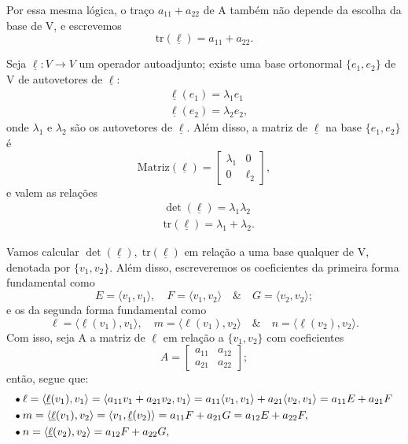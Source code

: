 \documentclass[../differential_geometry.tex]{subfiles}
\begin{document}
Por essa mesma lógica, o traço \(a_{11} + a_{22}\) de A também não depende da escolha da base de V, e escrevemos
\[
	\mathrm{tr}(\underline{\ell}) = a_{11} + a_{22}.
\]

\begin{theorem*}
	Seja \(\underline{\ell }:V\rightarrow V\) um operador autoadjunto; existe uma base ortonormal \(\{e_1, e_2\}\) de V de autovetores de \(\underline{\ell }\):
	\begin{align*}
		 & \underline{\ell }(e_1) = \lambda_1e_1  \\
		 & \underline{\ell }(e_2) = \lambda_2e_2,
	\end{align*}
	onde \(\lambda_1\) e \(\lambda_{2}\) são os autovetores de \(\underline{\ell }\). Além disso, a matriz de \(\underline{\ell }\) na base \(\{e_1, e_2\}\) é
	\[
		\mathrm{Matriz}(\underline{\ell }) = \begin{bmatrix}
			\lambda_1 & 0      \\
			0         & \ell_2
		\end{bmatrix},
	\]
	e valem as relações
	\begin{align*}
		 & \det{(\underline{\ell })}=\lambda_1\lambda_2            \\
		 & \mathrm{tr}(\underline{\ell }) = \lambda_1 + \lambda_2.
	\end{align*}
\end{theorem*}
Vamos calcular \(\det{(\underline{\ell })},\; \mathrm{tr}(\underline{\ell })\) em relação a uma base qualquer de V, denotada por \(\{v_1, v_2\}\). Além disso, escreveremos os coeficientes da primeira forma fundamental como
\[
	E = \langle v_1, v_1 \rangle,\quad F = \langle v_1, v_2 \rangle \quad\&\quad G = \langle v_2, v_2 \rangle;
\]
e os da segunda forma fundamental como
\[
	\ell = \langle \underline{\ell }(v_1), v_1 \rangle,\quad m = \langle \ell (v_1), v_2 \rangle \quad\&\quad n = \langle \underline{\ell} (v_2), v_2 \rangle.
\]
Com isso, seja A a matriz de \(\underline{\ell }\) em relação a \(\{v_1, v_2\}\) com coeficientes
\[
	A = \begin{bmatrix}
		a_{11} & a_{12} \\
		a_{21} & a_{22}
	\end{bmatrix};
\]
então, segue que:
\begin{align*}
	 & \tikz[baseline=-0.5ex]\draw[black, fill=black, radius=1.5pt](0, 0)circle;\; \ell = \langle \underline{\ell }(v_1), v_1 \rangle = \langle a_{11}v_1 + a_{21}v_2, v_1 \rangle = a_{11}\langle v_1, v_1 \rangle + a_{21}\langle v_{2}, v_1 \rangle = a_{11}E + a_{21}F \\
	 & \tikz[baseline=-0.5ex]\draw[black, fill=black, radius=1.5pt](0, 0)circle;\; m = \langle \underline{\ell }(v_1), v_2 \rangle = \langle v_1, \underline{\ell }(v_2) \rangle = a_{11}F + a_{21}G = a_{12}E + a_{22}F,                                                  \\
	 & \tikz[baseline=-0.5ex]\draw[black, fill=black, radius=1.5pt](0, 0)circle;\; n = \langle \underline{\ell }(v_2), v_2 \rangle = a_{12}F + a_{22}G,
\end{align*}
\end{document}

